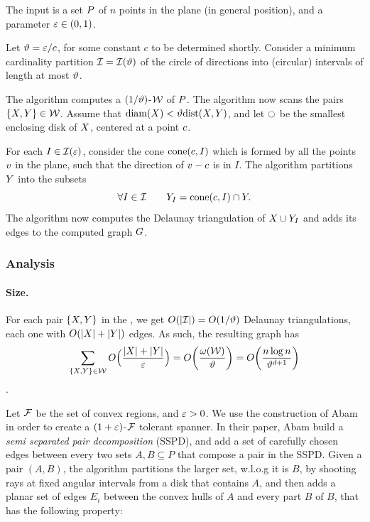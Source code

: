 \documentclass[12pt]{article}%
\begin{document}
The input is a set $P$ of $n$ points in the plane (in general
position), and a parameter $\varepsilon \in (0,1)$.


\newcommand{\coneY}[2]{\mathrm{cone}\pth{#1,#2}}%
\newcommand{\IS}{\Mh{\mathcal{I}}}%
\newcommand{\epsA}{\Mh{\vartheta}}%

Let $\epsA = \eps/c$, for some constant $c$ to be determined shortly.
Consider a minimum cardinality partition $\IS = \IS(\epsA)$ of the
circle of directions into (circular) intervals of length at most
$\epsA$.

The algorithm computes a $(1/\epsA)$-\SSPD $\mathcal{W}$ of
$P$. The algorithm now scans the pairs  $\{ X, Y \} \in
\mathcal{W}$.  Assume that
$\diameterX{\PSB} < \epsA\DistSetY{\PSB}{\PSC}$, and let $\ocircle$ be
the smallest enclosing disk of $X$, centered at a point $c$.

For each $I \in \IS(\eps)$, consider the cone $\coneY{\cen}{I}$ which
is formed by all the points $v$ in the plane, such that the
direction of $v - c$ is in $I$. The algorithm partitions $Y$
into the subsets
\begin{equation*}
    \forall I \in \IS \qquad \PSC_I = \coneY{\cen}{I} \cap \PSC.
\end{equation*}
The algorithm now computes the Delaunay triangulation of
$X \cup Y_I$ and adds its edges to the computed graph $G$.

\subsubsection{Analysis}

\paragraph{Size.} For each pair $\{X, Y\}$ in the \SSPD, we get
$O(|\IS|) = O(1/\epsA)$ Delaunay triangulations, each one with $O(
|X| + |Y|)$ edges. As such, the resulting graph has
\begin{equation*}
    \sum_{\{\PSB, \PSC\} \in \WSPDRep} O\Bigl(
    \frac{|\PSB| + |\PSC|}{\eps} \Bigr)
    =%
    O\pth{ \frac{\WeightX{\WSPDRep}}{\epsA} }%
    =%
    O\pth{ \frac{n\log n}{{\epsA}^{d+1}}}
\end{equation*}
. 







Let $\mathcal{F}$ be the set of convex regions, and $\varepsilon>0$. We use the
construction of Abam \etal \cite{abfg-rftgs-09} in order to create a
$(1+\varepsilon)$-$\mathcal{F}$ tolerant spanner. In their paper, Abam \etal build a
\emph{semi separated pair decomposition} (SSPD), and add a set of
carefully chosen edges between every two sets $A,B\subseteq P$ that
compose a pair in the SSPD. Given a pair $(A,B)$, the algorithm
partitions the larger set, w.l.o.g it is $B$, by shooting rays at
fixed angular intervals from a disk that contains $A$, and then adds a
planar set of edges $E_i$ between the convex hulls of $A$ and every
part $B$ of $B$, that has the following property:
\end{document}
